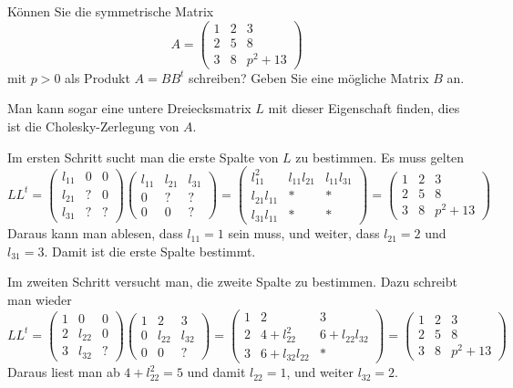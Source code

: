 Können Sie die symmetrische Matrix
\[
A=\begin{pmatrix}
 1&2&3\\
 2&5&8\\
 3&8&p^2 + 13
\end{pmatrix}
\]
mit $p>0$ als Produkt $A=BB^t$ schreiben?
Geben Sie eine mögliche Matrix $B$ an.

\begin{loesung}
Man kann sogar eine untere Dreiecksmatrix $L$ mit dieser Eigenschaft finden,
dies ist die Cholesky-Zerlegung von $A$.

Im ersten Schritt sucht man die erste Spalte von $L$ zu bestimmen.
Es muss gelten
\[
LL^t=
\begin{pmatrix}
l_{11}&  0&  0\\
l_{21}&  ?&  0\\
l_{31}&  ?&  ?
\end{pmatrix}
\begin{pmatrix}
l_{11}&l_{21}&l_{31}\\
     0&     ?&     ?\\
     0&     0&     ?
\end{pmatrix}
=
\begin{pmatrix}
    l_{11}^2&l_{11}l_{21}&l_{11}l_{31}\\
l_{21}l_{11}&           *&           *\\
l_{31}l_{11}&           *&           *
\end{pmatrix}
=
\begin{pmatrix}
 1&2&3\\
 2&5&8\\
 3&8&p^2 + 13
\end{pmatrix}
\]
Daraus kann man ablesen, dass $l_{11}=1$ sein muss, und weiter,
dass
$l_{21}=2$ und $l_{31}=3$. Damit ist die erste Spalte bestimmt.

Im zweiten Schritt versucht man, die zweite Spalte zu bestimmen.
Dazu schreibt man wieder
\[
LL^t
=
\begin{pmatrix}
1&     0&0\\
2&l_{22}&0\\
3&l_{32}&?
\end{pmatrix}
\begin{pmatrix}
1&     2&     3\\
0&l_{22}&l_{32}\\
0&     0&?
\end{pmatrix}
=
\begin{pmatrix}
 1&              2&             3\\
 2& 4+l_{22}^2    & 6+l_{22}l_{32}\\
 3& 6+l_{32}l_{22}&             *
\end{pmatrix}
=
\begin{pmatrix}
 1&2&3\\
 2&5&8\\
 3&8&p^2 + 13
\end{pmatrix}
\]
Daraus liest man ab $4+l_{22}^2=5$ und damit $l_{22}=1$, und weiter
$l_{32}=2$.


\end{loesung}
